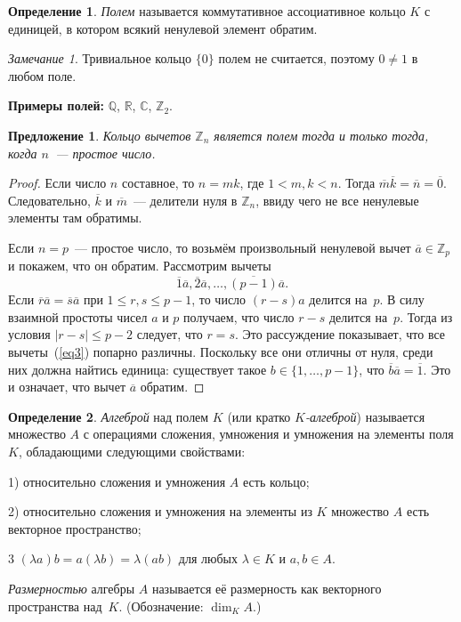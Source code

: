 \documentclass[a4paper, 12pt]{article}
\def\CC{{\mathbb C}}%
\def\ZZ{{\mathbb Z}}%
\def\RR{{\mathbb R}}%
\def\QQ{{\mathbb Q}}%
\newtheorem{proposition}{Предложение}
\theoremstyle{definition}
\newtheorem{definition}{Определение}
\theoremstyle{remark}
\newtheorem{remark}{Замечание}
\begin{document}
\begin{definition}
{\it Полем} называется коммутативное ассоциативное кольцо $K$ с
единицей, в котором всякий ненулевой элемент обратим.
\end{definition}

\begin{remark}
Тривиальное кольцо $\lbrace 0 \rbrace$ полем не считается, поэтому
$0 \ne 1$ в любом поле.
\end{remark}

\textbf{Примеры полей:} $\QQ$, $\RR$, $\CC$, $\ZZ_2$.

\begin{proposition}
Кольцо вычетов $\ZZ_n$ является полем тогда и только тогда, когда
$n$~--- простое число.
\end{proposition}

\begin{proof}
Если число $n$ составное, то $n = m k$, где $1 < m, k < n$. Тогда
$\overline{m} \overline{k} = \overline{n} = \overline{0}$.
Следовательно, $\overline k$ и $\overline m$~--- делители нуля в
$\ZZ_n$, ввиду чего не все ненулевые элементы там обратимы.

Если $n = p$~--- простое число, то возьмём произвольный ненулевой
вычет $\overline{a} \in \ZZ_p$ и покажем, что он обратим. Рассмотрим
вычеты
\begin{equation} \label{eq3}
\overline{1} \overline{a}, \overline{2} \overline{a}, \ldots,
\overline{(p-1)} \overline{a}.
\end{equation}
Если $\overline{r} \overline{a} = \overline{s} \overline{a}$ при $1
\leqslant r,s \leqslant p-1$, то число $(r - s)a$ делится на~$p$. В
силу взаимной простоты чисел $a$ и $p$ получаем, что число $r - s$
делится на~$p$. Тогда из условия $|r-s| \leqslant p - 2$ следует,
что $r = s$. Это рассуждение показывает, что все вычеты~(\ref{eq3})
попарно различны. Поскольку все они отличны от нуля, среди них
должна найтись единица: существует такое $b \in \lbrace 1, \ldots,
p-1 \rbrace$, что $\overline{b} \overline{a}=\overline{1}$. Это и
означает, что вычет $\overline{a}$ обратим.
\end{proof}

\begin{definition}
{\it Алгеброй} над полем $K$ (или кратко \textit{$K$-алгеброй})
называется множество $A$ с операциями сложения, умножения и
умножения на элементы поля $K$, обладающими следующими свойствами:

1) относительно сложения и умножения $A$ есть кольцо;

2) относительно сложения и умножения на элементы из $K$ множество
$A$ есть векторное пространство;

3 $(\lambda a)b=a(\lambda b)=\lambda(ab)$ для любых $\lambda\in K$ и
$a,b\in A$.

{\it Размерностью} алгебры $A$ называется её размерность как
векторного пространства над~$K$. (Обозначение: $\dim_K A$.)
\end{definition}
\end{document}
